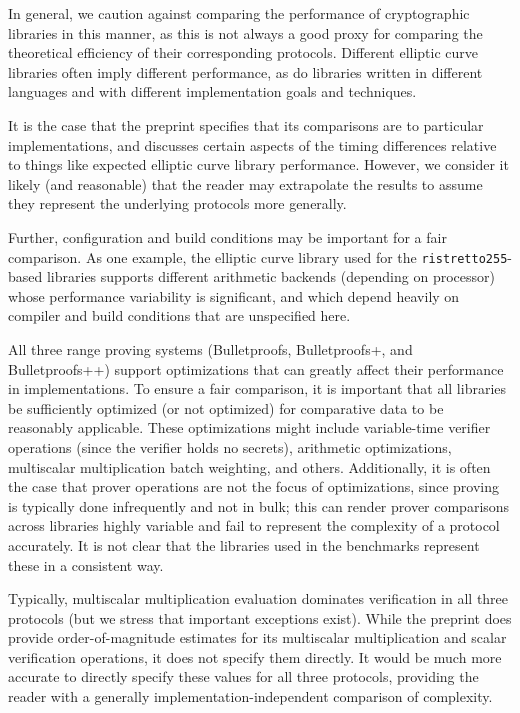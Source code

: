 \documentclass{article}
\begin{document}
In general, we caution against comparing the performance of cryptographic libraries in this manner, as this is not always a good proxy for comparing the theoretical efficiency of their corresponding protocols.
Different elliptic curve libraries often imply different performance, as do libraries written in different languages and with different implementation goals and techniques.

It is the case that the preprint specifies that its comparisons are to particular implementations, and discusses certain aspects of the timing differences relative to things like expected elliptic curve library performance.
However, we consider it likely (and reasonable) that the reader may extrapolate the results to assume they represent the underlying protocols more generally.

Further, configuration and build conditions may be important for a fair comparison.
As one example, the elliptic curve library used for the \texttt{ristretto255}-based libraries supports different arithmetic backends (depending on processor) whose performance variability is significant, and which depend heavily on compiler and build conditions that are unspecified here.

All three range proving systems (Bulletproofs, Bulletproofs+, and Bulletproofs++) support optimizations that can greatly affect their performance in implementations.
To ensure a fair comparison, it is important that all libraries be sufficiently optimized (or not optimized) for comparative data to be reasonably applicable.
These optimizations might include variable-time verifier operations (since the verifier holds no secrets), arithmetic optimizations, multiscalar multiplication batch weighting, and others.
Additionally, it is often the case that prover operations are not the focus of optimizations, since proving is typically done infrequently and not in bulk; this can render prover comparisons across libraries highly variable and fail to represent the complexity of a protocol accurately.
It is not clear that the libraries used in the benchmarks represent these in a consistent way.

Typically, multiscalar multiplication evaluation dominates verification in all three protocols (but we stress that important exceptions exist).
While the preprint does provide order-of-magnitude estimates for its multiscalar multiplication and scalar verification operations, it does not specify them directly.
It would be much more accurate to directly specify these values for all three protocols, providing the reader with a generally implementation-independent comparison of complexity.
\end{document}
